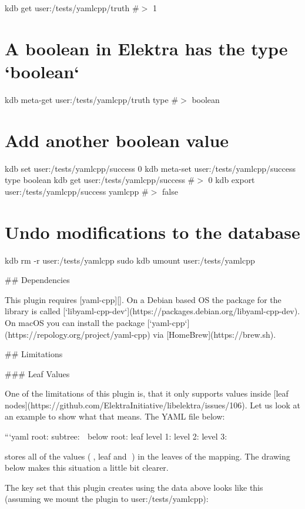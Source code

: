 kdb get user\+:/tests/yamlcpp/truth \#$>$ 1\hypertarget{autotoc_md807_autotoc_md876}{}\section{A boolean in Elektra has the type `boolean`}\label{autotoc_md807_autotoc_md876}
kdb meta-\/get user\+:/tests/yamlcpp/truth type \#$>$ boolean\hypertarget{autotoc_md807_autotoc_md877}{}\section{Add another boolean value}\label{autotoc_md807_autotoc_md877}
kdb set user\+:/tests/yamlcpp/success 0 kdb meta-\/set user\+:/tests/yamlcpp/success type boolean kdb get user\+:/tests/yamlcpp/success \#$>$ 0 kdb export user\+:/tests/yamlcpp/success yamlcpp \#$>$ false\hypertarget{autotoc_md807_autotoc_md878}{}\section{Undo modifications to the database}\label{autotoc_md807_autotoc_md878}
kdb rm -\/r user\+:/tests/yamlcpp sudo kdb umount user\+:/tests/yamlcpp 
\begin{DoxyCode}
## Dependencies

This plugin requires [yaml-cpp][]. On a Debian based OS the package for the library is called
       [`libyaml-cpp-dev`](https://packages.debian.org/libyaml-cpp-dev). On macOS you can install the package
       [`yaml-cpp`](https://repology.org/project/yaml-cpp) via [HomeBrew](https://brew.sh).

## Limitations

### Leaf Values

One of the limitations of this plugin is, that it only supports values inside [leaf
       nodes](https://github.com/ElektraInitiative/libelektra/issues/106). Let us look at an example to show what that means. The YAML
       file below:

```yaml
root:
  subtree: 🍂
  below root: leaf
level 1:
  level 2:
    level 3: 🍁
\end{DoxyCode}


stores all of the values ({\ttfamily 🍂}, {\ttfamily leaf} and {\ttfamily 🍁}) in the leaves of the mapping. The drawing below makes this situation a little bit clearer.



The key set that this plugin creates using the data above looks like this (assuming we mount the plugin to {\ttfamily user\+:/tests/yamlcpp})\+:

